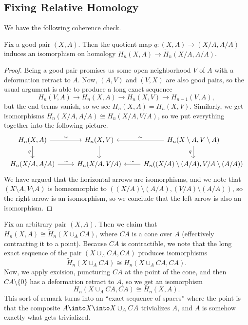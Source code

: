 \documentclass[../notes.tex]{subfiles}
\begin{document}
\subsection{Fixing Relative Homology}
We have the following coherence check.
\begin{proposition} \label{prop:quot-on-homology}
	Fix a good pair $(X,A)$. Then the quotient map $q\colon(X,A)\to (X/A,A/A)$ induces an isomorphism on homology $H_n(X,A)\to\widetilde H_n(X/A,A/A)$.
\end{proposition}
\begin{proof}
	Being a good pair promises us some open neighborhood $V$ of $A$ with a deformation retract to $A$. Now, $(A,V)$ and $(V,X)$ are also good pairs, so the usual argument is able to produce a long exact sequence
	\[H_n(V,A)\to H_n(X,A)\to H_n(X,V)\to H_{n-1}(V,A),\]
	but the end terms vanish, so we see $H_n(X,A)=H_n(X,V)$. Similarly, we get isomorphisms $H_n(X/A,A/A)\cong H_n(X/A,V/A)$, so we put everything together into the following picture.
	\[\begin{tikzcd}
		{H_n(X,A)} & {H_n(X,V)} & {H_n(X\setminus A,V\setminus A)} \\
		{H_n(X/A,A/A)} & {H_n(X/A,V/A)} & {H_n((X/A)\setminus (A/A),V/A\setminus (A/A))}
		\arrow["\sim", from=1-1, to=1-2]
		\arrow["\sim", from=2-1, to=2-2]
		\arrow["\sim"', from=1-3, to=1-2]
		\arrow["\sim"', from=2-3, to=2-2]
		\arrow["q"', from=1-1, to=2-1]
		\arrow[from=1-2, to=2-2]
		\arrow["q"', from=1-3, to=2-3]
	\end{tikzcd}\]
	We have argued that the horizontal arrows are isomorphisms, and we note that $(X\setminus A,V\setminus A)$ is homeomorphic to $((X/A)\setminus (A/A),(V/A)\setminus(A/A))$, so the right arrow is an isomorphism, so we conclude that the left arrow is also an isomorphism.
\end{proof}
\begin{remark}
	Fix an arbitrary pair $(X,A)$. Then we claim that $H_n(X,A)\cong\widetilde H_n(X\cup_ACA)$, where $CA$ is a cone over $A$ (effectively contracting it to a point). Because $CA$ is contractible, we note that the long exact sequence of the pair $(X\cup_ACA,CA)$ produces isomorphisms
	\[\widetilde H_n(X\cup_ACA)\cong H_n(X\cup_ACA,CA).\]
	Now, we apply excision, puncturing $CA$ at the point of the cone, and then $CA\setminus\{0\}$ has a deformation retract to $A$, so we get an isomorphism
	\[H_n(X\cup_ACA,CA)\cong H_n(X,A).\]
	This sort of remark turns into an ``exact sequence of spaces'' where the point is that the composite $A\into X\into X\cup_ACA$ trivializes $A$, and $A$ is somehow exactly what gets trivialized.
\end{remark}
\end{document}

